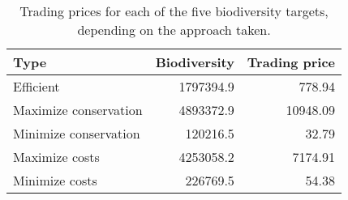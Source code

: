 \begin{table}

\caption{\label{tab:trading-prices}Trading prices for each of the five biodiversity targets, depending on the approach taken.}
\centering
\begin{tabular}[t]{l|r|r}
\hline
Type & Biodiversity & Trading price\\
\hline
Efficient & 1797394.9 & 778.94\\
\hline
Maximize conservation & 4893372.9 & 10948.09\\
\hline
Minimize conservation & 120216.5 & 32.79\\
\hline
Maximize costs & 4253058.2 & 7174.91\\
\hline
Minimize costs & 226769.5 & 54.38\\
\hline
\end{tabular}
\end{table}